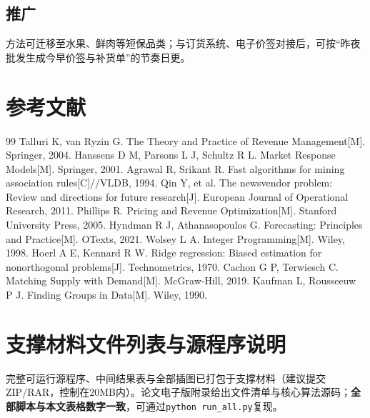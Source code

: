 \documentclass[UTF8,a4paper,12pt]{ctexart}
\begin{document}
\subsection{推广}
方法可迁移至水果、鲜肉等短保品类；与订货系统、电子价签对接后，可按``昨夜批发生成今早价签与补货单''的节奏日更。

\section{参考文献}
\begin{thebibliography}{99}
 Talluri K, van Ryzin G. The Theory and Practice of Revenue Management[M]. Springer, 2004.
 Hanssens D M, Parsons L J, Schultz R L. Market Response Models[M]. Springer, 2001.
 Agrawal R, Srikant R. Fast algorithms for mining association rules[C]//VLDB, 1994.
 Qin Y, et al. The newsvendor problem: Review and directions for future research[J]. European Journal of Operational Research, 2011.
 Phillips R. Pricing and Revenue Optimization[M]. Stanford University Press, 2005.
 Hyndman R J, Athanasopoulos G. Forecasting: Principles and Practice[M]. OTexts, 2021.
 Wolsey L A. Integer Programming[M]. Wiley, 1998.
 Hoerl A E, Kennard R W. Ridge regression: Biased estimation for nonorthogonal problems[J]. Technometrics, 1970.
 Cachon G P, Terwiesch C. Matching Supply with Demand[M]. McGraw-Hill, 2019.
 Kaufman L, Rousseeuw P J. Finding Groups in Data[M]. Wiley, 1990.
\end{thebibliography}

\appendix
\section{支撑材料文件列表与源程序说明}
完整可运行源程序、中间结果表与全部插图已打包于支撑材料（建议提交ZIP/RAR，控制在20MB内）。论文电子版附录给出文件清单与核心算法源码；\textbf{全部脚本与本文表格数字一致}，可通过\texttt{python run\_all.py}复现。
\end{document}
